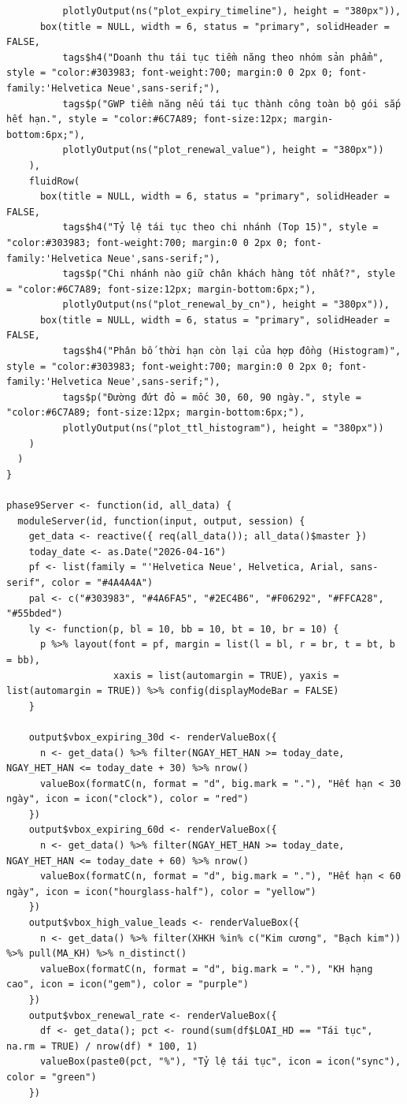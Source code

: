 \documentclass[12pt, a4paper]{article}
\begin{document}
\begin{lstlisting}
          plotlyOutput(ns("plot_expiry_timeline"), height = "380px")),
      box(title = NULL, width = 6, status = "primary", solidHeader = FALSE,
          tags$h4("Doanh thu tái tục tiềm năng theo nhóm sản phẩm", style = "color:#303983; font-weight:700; margin:0 0 2px 0; font-family:'Helvetica Neue',sans-serif;"),
          tags$p("GWP tiềm năng nếu tái tục thành công toàn bộ gói sắp hết hạn.", style = "color:#6C7A89; font-size:12px; margin-bottom:6px;"),
          plotlyOutput(ns("plot_renewal_value"), height = "380px"))
    ),
    fluidRow(
      box(title = NULL, width = 6, status = "primary", solidHeader = FALSE,
          tags$h4("Tỷ lệ tái tục theo chi nhánh (Top 15)", style = "color:#303983; font-weight:700; margin:0 0 2px 0; font-family:'Helvetica Neue',sans-serif;"),
          tags$p("Chi nhánh nào giữ chân khách hàng tốt nhất?", style = "color:#6C7A89; font-size:12px; margin-bottom:6px;"),
          plotlyOutput(ns("plot_renewal_by_cn"), height = "380px")),
      box(title = NULL, width = 6, status = "primary", solidHeader = FALSE,
          tags$h4("Phân bố thời hạn còn lại của hợp đồng (Histogram)", style = "color:#303983; font-weight:700; margin:0 0 2px 0; font-family:'Helvetica Neue',sans-serif;"),
          tags$p("Đường đứt đỏ = mốc 30, 60, 90 ngày.", style = "color:#6C7A89; font-size:12px; margin-bottom:6px;"),
          plotlyOutput(ns("plot_ttl_histogram"), height = "380px"))
    )
  )
}

phase9Server <- function(id, all_data) {
  moduleServer(id, function(input, output, session) {
    get_data <- reactive({ req(all_data()); all_data()$master })
    today_date <- as.Date("2026-04-16")
    pf <- list(family = "'Helvetica Neue', Helvetica, Arial, sans-serif", color = "#4A4A4A")
    pal <- c("#303983", "#4A6FA5", "#2EC4B6", "#F06292", "#FFCA28", "#55bded")
    ly <- function(p, bl = 10, bb = 10, bt = 10, br = 10) {
      p %>% layout(font = pf, margin = list(l = bl, r = br, t = bt, b = bb),
                   xaxis = list(automargin = TRUE), yaxis = list(automargin = TRUE)) %>% config(displayModeBar = FALSE)
    }

    output$vbox_expiring_30d <- renderValueBox({
      n <- get_data() %>% filter(NGAY_HET_HAN >= today_date, NGAY_HET_HAN <= today_date + 30) %>% nrow()
      valueBox(formatC(n, format = "d", big.mark = "."), "Hết hạn < 30 ngày", icon = icon("clock"), color = "red")
    })
    output$vbox_expiring_60d <- renderValueBox({
      n <- get_data() %>% filter(NGAY_HET_HAN >= today_date, NGAY_HET_HAN <= today_date + 60) %>% nrow()
      valueBox(formatC(n, format = "d", big.mark = "."), "Hết hạn < 60 ngày", icon = icon("hourglass-half"), color = "yellow")
    })
    output$vbox_high_value_leads <- renderValueBox({
      n <- get_data() %>% filter(XHKH %in% c("Kim cương", "Bạch kim")) %>% pull(MA_KH) %>% n_distinct()
      valueBox(formatC(n, format = "d", big.mark = "."), "KH hạng cao", icon = icon("gem"), color = "purple")
    })
    output$vbox_renewal_rate <- renderValueBox({
      df <- get_data(); pct <- round(sum(df$LOAI_HD == "Tái tục", na.rm = TRUE) / nrow(df) * 100, 1)
      valueBox(paste0(pct, "%"), "Tỷ lệ tái tục", icon = icon("sync"), color = "green")
    })


\end{lstlisting}
\end{document}
